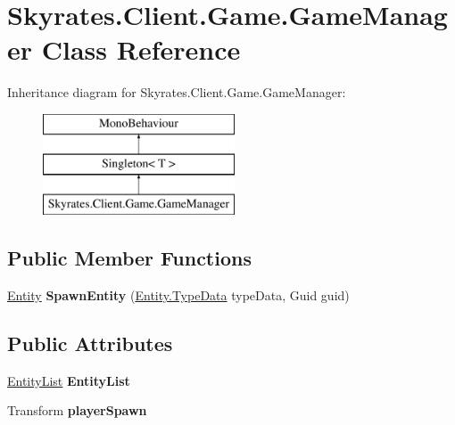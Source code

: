 \hypertarget{class_skyrates_1_1_client_1_1_game_1_1_game_manager}{\section{Skyrates.\-Client.\-Game.\-Game\-Manager Class Reference}
\label{class_skyrates_1_1_client_1_1_game_1_1_game_manager}
}
Inheritance diagram for Skyrates.\-Client.\-Game.\-Game\-Manager\-:\begin{figure}[H]
\begin{center}
\leavevmode
\includegraphics[height=3.000000cm]{class_skyrates_1_1_client_1_1_game_1_1_game_manager}
\end{center}
\end{figure}
\subsection*{Public Member Functions}
\begin{DoxyCompactItemize}
\item 
\hypertarget{class_skyrates_1_1_client_1_1_game_1_1_game_manager_a435556288f74532ff130bb649a330d20}{\hyperlink{class_skyrates_1_1_common_1_1_entity_1_1_entity}{Entity} {\bfseries Spawn\-Entity} (\hyperlink{class_skyrates_1_1_common_1_1_entity_1_1_entity_1_1_type_data}{Entity.\-Type\-Data} type\-Data, Guid guid)}\label{class_skyrates_1_1_client_1_1_game_1_1_game_manager_a435556288f74532ff130bb649a330d20}

\end{DoxyCompactItemize}
\subsection*{Public Attributes}
\begin{DoxyCompactItemize}
\item 
\hypertarget{class_skyrates_1_1_client_1_1_game_1_1_game_manager_a6cd625a0d48f736b04afc3ec98e4ed53}{\hyperlink{class_skyrates_1_1_common_1_1_entity_1_1_entity_list}{Entity\-List} {\bfseries Entity\-List}}\label{class_skyrates_1_1_client_1_1_game_1_1_game_manager_a6cd625a0d48f736b04afc3ec98e4ed53}

\item 
\hypertarget{class_skyrates_1_1_client_1_1_game_1_1_game_manager_a39846b49f8069b0d99ce5622aac06ac8}{Transform {\bfseries player\-Spawn}}\label{class_skyrates_1_1_client_1_1_game_1_1_game_manager_a39846b49f8069b0d99ce5622aac06ac8}

\end{DoxyCompactItemize}

